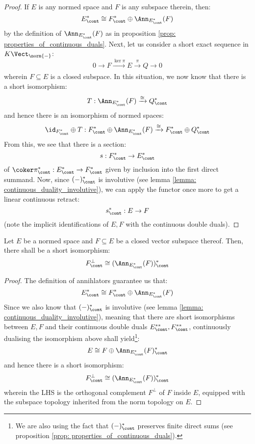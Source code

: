             \begin{proof}
                If $E$ is any normed space and $F$ is any subspace therein, then:
                    $$E^*_{\cont} \cong F^*_{\cont} \oplus \Ann_{E^*_{\cont}}(F)$$
                by the definition of $\Ann_{E^*_{\cont}}(F)$ as in proposition \ref{prop: properties_of_continuous_duals}. Next, let us consider a short exact sequence in $K\-\Vect_{\norm{-}}$:
                    $$0 \to F \xrightarrow[]{\ker \pi} E \xrightarrow[]{\pi} Q \to 0$$
                wherein $F \subseteq E$ is a closed subspace. In this situation, we now know that there is a short isomorphism:
                    $$T: \Ann_{E^*_{\cont}}(F) \xrightarrow[]{\cong} Q^*_{\cont}$$
                and hence there is an isomorphism of normed spaces:
                    $$\id_{F^*_{\cont}} \oplus T: F^*_{\cont} \oplus \Ann_{E^*_{\cont}}(F) \xrightarrow[]{\cong} F^*_{\cont} \oplus Q^*_{\cont}$$
                From this, we see that there is a section:
                    $$s: F^*_{\cont} \to E^*_{\cont}$$
                of $\coker \pi^*_{\cont}: E^*_{\cont} \to F^*_{\cont}$ given by inclusion into the first direct summand. Now, since $(-)^*_{\cont}$ is involutive (see lemma \ref{lemma: continuous_duality_involutive}), we can apply the functor once more to get a linear continuous retract:
                    $$s^*_{\cont}: E \to F$$
                (note the implicit identifications of $E, F$ with the continuous double duals).
            \end{proof}
        \begin{corollary} \label{coro: annihilators_vs_orthogonal_complements}
            Let $E$ be a normed space and $F \subseteq E$ be a closed vector subspace thereof. Then, there shall be a short isomorphism:
                $$F^{\perp}_{\cont} \cong ( \Ann_{E^*_{\cont}}(F) )^*_{\cont}$$
        \end{corollary}
            \begin{proof}
                The definition of annihlators guarantee us that:
                    $$E^*_{\cont} \cong F^*_{\cont} \oplus \Ann_{E^*_{\cont}}(F)$$
                Since we also know that $(-)^*_{\cont}$ is involutive (see lemma \ref{lemma: continuous_duality_involutive}), meaning that there are short isomorphisms between $E, F$ and their continuous double duals $E^{**}_{\cont}, F^{**}_{\cont}$, continuously dualising the isomorphism above shall yield\footnote{We are also using the fact that $(-)^*_{\cont}$ preserves finite direct sums (see proposition \ref{prop: properties_of_continuous_duals}).}:
                    $$E \cong F \oplus \Ann_{E^*_{\cont}}(F)^*_{\cont}$$
                and hence there is a short isomorphism:
                    $$F^{\perp}_{\cont} \cong ( \Ann_{E^*_{\cont}}(F) )^*_{\cont}$$
                wherein the LHS is the orthogonal complement $F^{\perp}$ of $F$ inside $E$, equipped with the subspace topology inherited from the norm topology on $E$.
            \end{proof}
